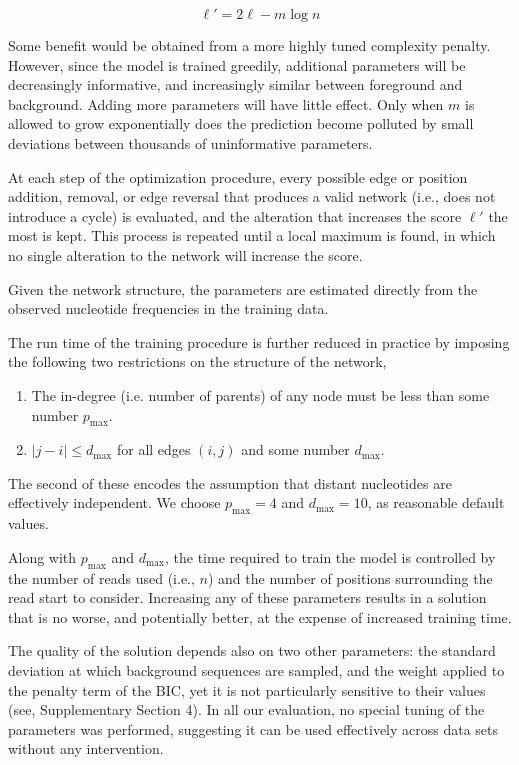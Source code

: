\documentclass{bioinfo}
\begin{document}
$$ \ell' = 2 \ell - m \log n $$

Some benefit would be obtained from a more highly tuned complexity penalty.
However, since the model is trained greedily, additional parameters will be
decreasingly informative, and increasingly similar between foreground and
background. Adding more parameters will have little effect.  Only when $m$ is
allowed to grow exponentially does the prediction become polluted by small
deviations between thousands of uninformative parameters.

At each step of the optimization procedure, every possible edge or position
addition, removal, or edge reversal that produces a valid network (i.e., does not
introduce a cycle) is evaluated, and the alteration that increases the score
$\ell'$ the most is kept.  This process is repeated until a local maximum is
found, in which no single alteration to the network will increase the score.

Given the network structure, the parameters are estimated directly from the
observed nucleotide frequencies in the training data.

The run time of the training procedure is further reduced in practice by imposing the
following two restrictions on the structure of the network,
\begin{enumerate}
\item The in-degree (i.e. number of parents) of any node must be less than some
number $p_{\text{max}}$.
\item $|j - i| \le d_{\text{max}}$ for all edges $(i,j)$ and some number $d_{\text{max}}$.
\end{enumerate}
The second of these encodes the assumption that distant nucleotides are
effectively independent. We choose $p_{\text{max}} = 4$ and $d_{\text{max}} =
10$, as reasonable default values.

Along with $p_{\text{max}}$ and $d_{\text{max}}$, the time required to train the
model is controlled by the number of reads used (i.e., $n$) and the number of
positions surrounding the read start to consider. Increasing any of these
parameters results in a solution that is no worse, and potentially better, at
the expense of increased training time.

The quality of the solution depends also on two other parameters: the standard
deviation at which background sequences are sampled, and the weight applied to
the penalty term of the BIC, yet it is not particularly sensitive to their values
(see, Supplementary Section 4). In all our evaluation, no special tuning of the
parameters was performed, suggesting it can be used effectively across data sets
without any intervention.
\end{document}
